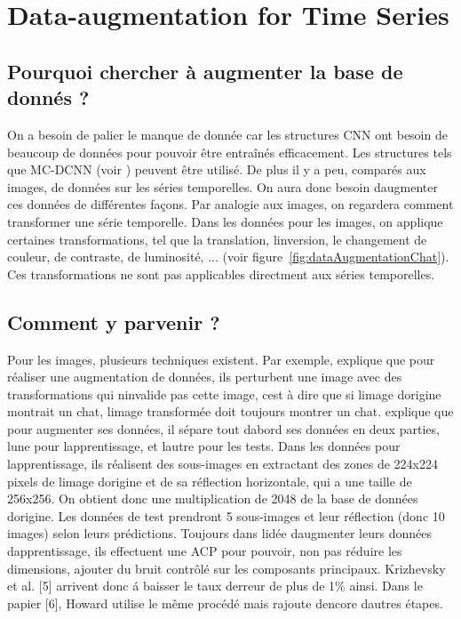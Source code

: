 \documentclass[11pt]{sdm}
\begin{document}
\section{Data-augmentation for Time Series}
	\subsection{Pourquoi chercher \`a augmenter la base de donn\'es ?}
		On a besoin de palier le manque de donn\'ee car les structures CNN ont besoin de beaucoup de donn\'ees pour pouvoir \^etre entra\^in\'es efficacement. Les structures tels que MC-DCNN (voir \cite{zheng2014time}) peuvent \^etre utilis\'e.
		De plus il y a peu, compar\'es aux images, de donn\'ees sur les s\'eries temporelles. On aura donc besoin d\textquotesingle augmenter ces donn\'ees de diff\'erentes fa\c cons.
		Par analogie aux images, on regardera comment transformer une s\'erie temporelle. Dans les donn\'ees pour les images, on applique certaines transformations, tel que la translation, l\textquotesingle inversion, le changement de couleur, de contraste, de luminosit\'e, ... (voir figure~\ref{fig:dataAugmentationChat}). Ces transformations ne sont pas applicables directment aux s\'eries temporelles.

	\subsection{Comment y parvenir ?}
		Pour les images, plusieurs techniques existent. Par exemple, \cite{chatfield2014return} explique que pour r\'ealiser une augmentation de donn\'ees, ils perturbent une image avec des transformations qui n\textquotesingle invalide pas cette image, c\textquotesingle est \`a dire que si l\textquotesingle image d\textquotesingle origine montrait un chat, l\textquotesingle image transform\'ee doit toujours montrer un chat. \cite{krizhevsky2012imagenet} explique que pour augmenter ses donn\'ees, il s\'epare tout d\textquotesingle abord ses donn\'ees en deux parties, l\textquotesingle une pour l\textquotesingle apprentissage, et l\textquotesingle autre pour les tests. Dans les donn\'ees pour l\textquotesingle apprentissage, ils r\'ealisent des sous-images en extractant des zones de 224x224 pixels de l\textquotesingle image d\textquotesingle origine et de sa r\'eflection horizontale, qui a une taille de 256x256. On obtient donc une multiplication de 2048 de la base de donn\'ees d\textquotesingle origine. Les donn\'ees de test prendront 5 sous-images et leur r\'eflection (donc 10 images) selon leurs pr\'edictions. Toujours dans l\textquotesingle id\'ee d\textquotesingle augmenter leurs donn\'ees d\textquotesingle apprentissage, ils effectuent une ACP pour pouvoir, non pas r\'eduire les dimensions, ajouter du bruit contrôl\'e sur les composants principaux. Krizhevsky et al. [5] arrivent donc \'a baisser le taux d\textquotesingle erreur de plus de 1\% ainsi. Dans le papier [6], Howard utilise le m\^eme proc\'ed\'e mais rajoute d\textquotesingle encore d\textquotesingle autres \'etapes. 
\end{document}
